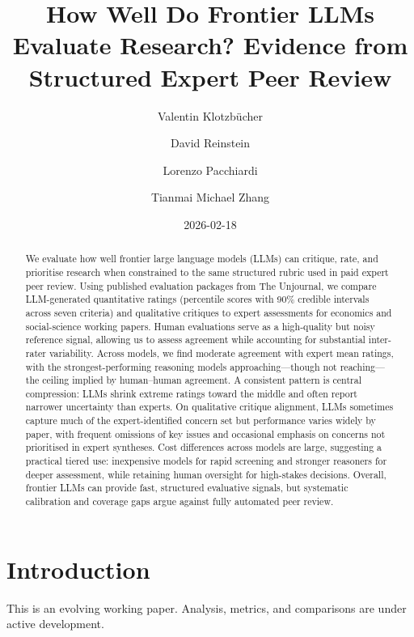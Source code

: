 \documentclass[
  11pt,
  letterpaper,
]{article}
\title{How Well Do Frontier LLMs Evaluate Research? Evidence from
Structured Expert Peer Review}
\author{Valentin Klotzbücher \and David Reinstein \and Lorenzo
Pacchiardi \and Tianmai Michael Zhang}
\date{2026-02-18}
\begin{document}
\maketitle
\begin{abstract}
We evaluate how well frontier large language models (LLMs) can critique,
rate, and prioritise research when constrained to the same structured
rubric used in paid expert peer review. Using published evaluation
packages from The Unjournal, we compare LLM-generated quantitative
ratings (percentile scores with 90\% credible intervals across seven
criteria) and qualitative critiques to expert assessments for economics
and social-science working papers. Human evaluations serve as a
high-quality but noisy reference signal, allowing us to assess agreement
while accounting for substantial inter-rater variability. Across models,
we find moderate agreement with expert mean ratings, with the
strongest-performing reasoning models approaching---though not
reaching---the ceiling implied by human--human agreement. A consistent
pattern is central compression: LLMs shrink extreme ratings toward the
middle and often report narrower uncertainty than experts. On
qualitative critique alignment, LLMs sometimes capture much of the
expert-identified concern set but performance varies widely by paper,
with frequent omissions of key issues and occasional emphasis on
concerns not prioritised in expert syntheses. Cost differences across
models are large, suggesting a practical tiered use: inexpensive models
for rapid screening and stronger reasoners for deeper assessment, while
retaining human oversight for high-stakes decisions. Overall, frontier
LLMs can provide fast, structured evaluative signals, but systematic
calibration and coverage gaps argue against fully automated peer review.
\end{abstract}



\section{Introduction}\label{introduction}

\begin{tcolorbox}[enhanced jigsaw, colback=white, rightrule=.15mm, opacitybacktitle=0.6, toptitle=1mm, titlerule=0mm, title=\textcolor{quarto-callout-note-color}{\faInfo}\hspace{0.5em}{Working paper}, bottomtitle=1mm, toprule=.15mm, colbacktitle=quarto-callout-note-color!10!white, breakable, left=2mm, opacityback=0, coltitle=black, colframe=quarto-callout-note-color-frame, bottomrule=.15mm, arc=.35mm, leftrule=.75mm]

This is an evolving working paper. Analysis, metrics, and comparisons
are under active development.

\end{tcolorbox}
\end{document}
